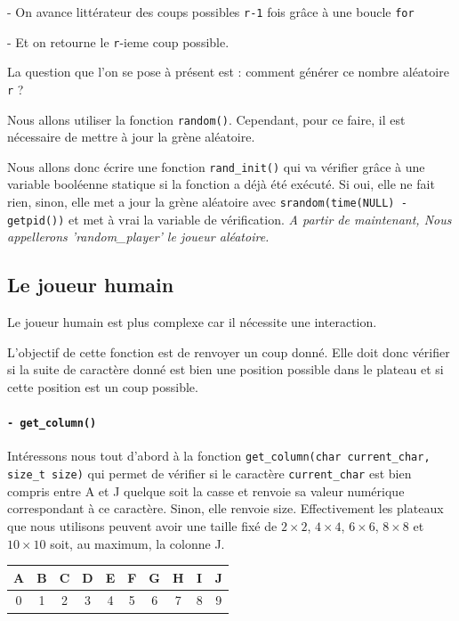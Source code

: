 \documentclass{report}
\begin{document}
- On avance littérateur des coups possibles \texttt{r-1} fois grâce à une boucle \texttt{for}

- Et on retourne le \texttt{r}-ieme coup possible.
\newline

La question que l'on se pose à présent est : comment générer ce nombre aléatoire \texttt{r} ?

Nous allons utiliser la fonction \texttt{random()}. Cependant, pour ce faire, il est nécessaire de mettre à jour la grène aléatoire.

Nous allons donc écrire une fonction \texttt{rand\_init()} qui va vérifier grâce à une variable booléenne statique si la fonction a déjà été exécuté. Si oui, elle ne fait rien, sinon, elle met a jour la grène aléatoire avec \texttt{srandom(time(NULL) - getpid())} et met à vrai la variable de vérification.\newline
\newline
\textit{A partir de maintenant, Nous appellerons 'random\_player' le joueur aléatoire.}


\subsection{Le joueur humain}
Le joueur humain est plus complexe car il nécessite une interaction.

L'objectif de cette fonction est de renvoyer un coup donné. Elle doit donc vérifier si la suite de caractère donné est bien une position possible dans le plateau et si cette position est un coup possible.

\paragraph{\texttt{- get\_column() }}
Intéressons nous tout d'abord à la fonction \texttt{get\_column(char current\_char, size\_t size)} qui permet de vérifier si le caractère \texttt{current\_char} est bien compris entre A et J quelque soit la casse et renvoie sa valeur numérique correspondant à ce caractère. Sinon, elle renvoie size. Effectivement les plateaux que nous utilisons peuvent avoir une taille fixé de $2\times2$, $4\times4$, $6\times6$, $8\times8$ et $10\times10$ soit, au maximum, la colonne J.

\begin{center}
\renewcommand{\arraystretch} {1.5}
       \begin{tabular}{|c|c|c|c|c|c|c|c|c|c|}
        \hline
        A & B & C & D & E & F & G & H & I & J \\
        \hline
        0 & 1 & 2 & 3 & 4 & 5 & 6 & 7 & 8 & 9 \\
        \hline
    \end{tabular}
\end{center}
\end{document}
